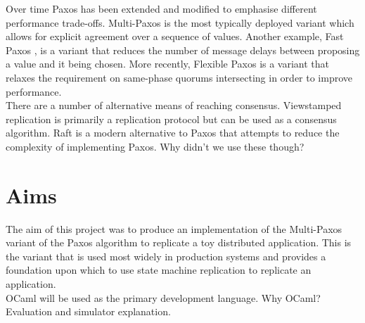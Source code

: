 Over time Paxos has been extended and modified to emphasise different performance trade-offs. Multi-Paxos is the most typically deployed variant which allows for explicit agreement over a sequence of values. Another example, Fast Paxos \cite{fast-paxos}, is a variant that reduces the number of message delays between proposing a value and it being chosen. More recently, Flexible Paxos \cite{DBLP:journals/corr/HowardMS16} is a variant that {\color{red}relaxes the requirement on same-phase quorums intersecting} in order to improve performance. \\

There are a number of alternative means of reaching consensus. Viewstamped replication \cite{Oki:1988:VRN:62546.62549} is primarily a replication protocol but can be used as a consensus algorithm. Raft \cite{Ongaro:2014:SUC:2643634.2643666} is a modern alternative to Paxos that attempts to reduce the complexity of implementing Paxos. {\color{red}Why didn't we use these though?}


\section{Aims}

The aim of this project was to produce an implementation of the Multi-Paxos variant of the Paxos algorithm to replicate a {\color{red}toy} distributed application. This is the variant that is used most widely in production systems and provides a foundation upon which to use state machine replication to replicate an application. \\

OCaml will be used as the primary development language. {\color{red}Why OCaml?} \\

{\color{red}Evaluation and simulator explanation.}\\






